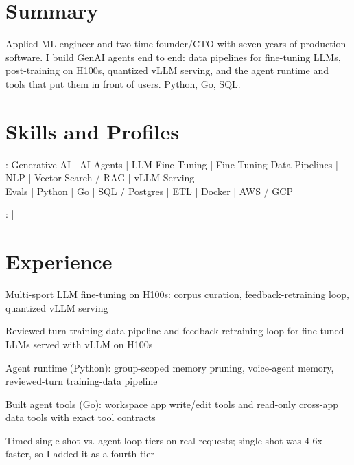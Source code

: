 \documentclass[print]{jack-resume}
\begin{document}
\pagecolor{darkmodeBackground}


\begin{minipage}[t][1cm][t]{.03\textwidth}
    \hfill
\end{minipage}

\section{Summary}
Applied ML engineer and two-time founder/CTO with seven years of production software. I build GenAI agents end to end: data pipelines for fine-tuning LLMs, post-training on H100s, quantized vLLM serving, and the agent runtime and tools that put them in front of users. Python, Go, SQL.
\sectionsep

\section{Skills and Profiles}
:
Generative AI \hfill | \hfill
AI Agents \hfill | \hfill
LLM Fine-Tuning \hfill | \hfill
Fine-Tuning Data Pipelines \hfill | \hfill
NLP \hfill | \hfill
Vector Search / RAG \hfill | \hfill
vLLM Serving \\
\hspace{1.0cm} Evals \hfill | \hfill
Python \hfill | \hfill
Go \hfill | \hfill
SQL / Postgres \hfill | \hfill
ETL \hfill | \hfill
Docker \hfill | \hfill
AWS / GCP \\

\raggedright{
    :
      \href{https://www.linkedin.com/in/jack-sturtevant/}{ \ExternalLink} |
     \href{https://github.com/jacksturt}{ \ExternalLink}}

\section{Experience}

\begin{tightemize}
    \item Multi-sport LLM fine-tuning on H100s: corpus curation, feedback-retraining loop, quantized vLLM serving
    \item Reviewed-turn training-data pipeline and feedback-retraining loop for fine-tuned LLMs served with vLLM on H100s
    \item Agent runtime (Python): group-scoped memory pruning, voice-agent memory, reviewed-turn training-data pipeline
    \item Built agent tools (Go): workspace app write/edit tools and read-only cross-app data tools with exact tool contracts
    \item Timed single-shot vs. agent-loop tiers on real requests; single-shot was 4-6x faster, so I added it as a fourth tier
\end{tightemize}
\sectionsep
\end{document}
